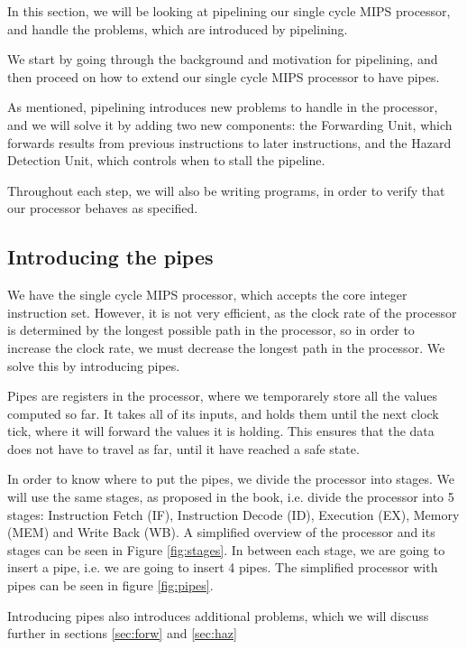 In this section, we will be looking at pipelining our single cycle MIPS
processor, and handle the problems, which are introduced by pipelining.

We start by going through the background and motivation for pipelining, and
then proceed on how to extend our single cycle MIPS processor to have pipes.

As mentioned, pipelining introduces new problems to handle in the processor,
and we will solve it by adding two new components: the Forwarding Unit, which
forwards results from previous instructions to later instructions, and the
Hazard Detection Unit, which controls when to stall the pipeline.

Throughout each step, we will also be writing programs, in order to verify that
our processor behaves as specified.

\subsection{Introducing the pipes}
We have the single cycle MIPS processor, which accepts the core integer
instruction set. However, it is not very efficient, as the clock rate of the
processor is determined by the longest possible path in the processor, so in
order to increase the clock rate, we must decrease the longest path in the
processor. We solve this by introducing pipes.

Pipes are registers in the processor, where we temporarely store all the values
computed so far. It takes all of its inputs, and holds them until the next
clock tick, where it will forward the values it is holding. This ensures that
the data does not have to travel as far, until it have reached a safe state.

In order to know where to put the pipes, we divide the processor into stages.
We will use the same stages, as proposed in the book\cite{ref:ark}, i.e. divide
the processor into 5 stages: Instruction Fetch (IF), Instruction Decode (ID),
Execution (EX), Memory (MEM) and Write Back (WB). A simplified overview of the
processor and its stages can be seen in Figure \ref{fig:stages}. In between
each stage, we are going to insert a pipe, i.e. we are going to insert 4 pipes.
The simplified processor with pipes can be seen in figure \ref{fig:pipes}.

Introducing pipes also introduces additional problems, which we will discuss
further in sections \ref{sec:forw} and \ref{sec:haz}

